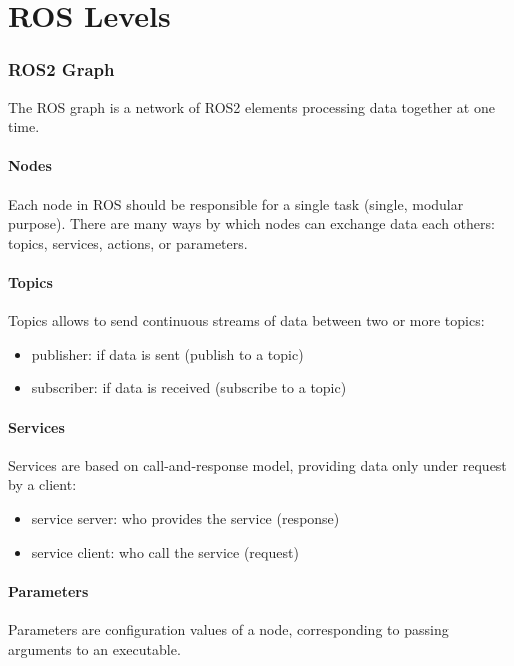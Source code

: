 \part{ROS Levels}

\section*{ROS2 Graph}

  The ROS graph is a network of ROS2 elements processing data together at one time.


  \subsection*{Nodes}
    Each node in ROS should be responsible for a single task (single, modular purpose).
    There are many ways by which nodes can exchange data each others: topics, services, actions, or parameters.


  \subsection*{Topics}
    Topics allows to send continuous streams of data between two or more topics:
    \begin{itemize}
      \item publisher: if data is sent (publish to a topic)
      \item subscriber: if data is received (subscribe to a topic)
    \end{itemize}


  \subsection*{Services}
    Services are based on call-and-response model, providing data only under request by a client:
    \begin{itemize}
      \item service server: who provides the service (response)
      \item service client: who call the service (request)
    \end{itemize}


  \subsection*{Parameters}
    Parameters are configuration values of a node, corresponding to passing arguments to an executable.


